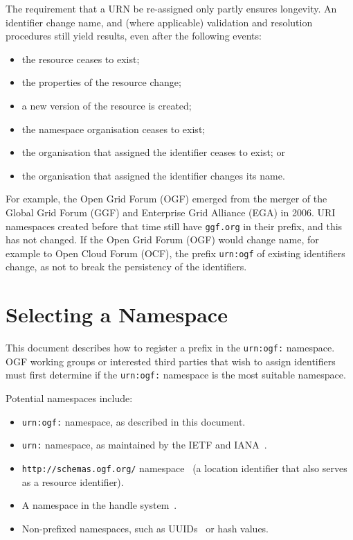 \documentclass[12pt]{article}  %
\begin{document}
The requirement that a URN \MUSTNOT{} be re-assigned only partly ensures longevity.
An identifier \MUSTNOT{} change name, and (where applicable) validation and 
resolution procedures \SHOULD{} still yield results, even after the following events:
\begin{itemize}
  \item the resource ceases to exist; 
  \item the properties of the resource change; 
  \item a new version of the resource is created; 
  \item the namespace organisation ceases to exist; 
  \item the organisation that assigned the identifier ceases to exist; or 
  \item the organisation that assigned the identifier changes its name.
\end{itemize}

For example, the Open Grid Forum (OGF) emerged from the merger of the Global
Grid Forum (GGF) and Enterprise Grid Alliance (EGA) in 2006. URI namespaces
created before that time still have \texttt{ggf.org} in their prefix, and this
has not changed. If the Open Grid Forum (OGF) would change name, for example to 
Open Cloud Forum (OCF), the prefix \texttt{urn:ogf} of existing identifiers 
\MUSTNOT{} change, as not to break the persistency of the identifiers.

\section{Selecting a Namespace}%
\label{sec:namespace_selection}

This document describes how to register a prefix in the \texttt{urn:ogf:} namespace.
OGF working groups or interested third parties that wish to assign identifiers must 
first determine if the \texttt{urn:ogf:} namespace is the most suitable namespace.

Potential namespaces include:
\begin{itemize}
  \item \texttt{urn:ogf:} namespace, as described in this document.
  \item \texttt{urn:} namespace, as maintained by the IETF and IANA~\cite{rfc3406}.
  \item \texttt{http://schemas.ogf.org/} namespace~\cite{gfd84}
    (a location identifier that also serves as a resource identifier).
  \item A namespace in the handle system~\cite{rfc3650}.
  \item Non-prefixed namespaces, such as UUIDs~\cite{x.667} or hash values.
\end{itemize}
\end{document}
